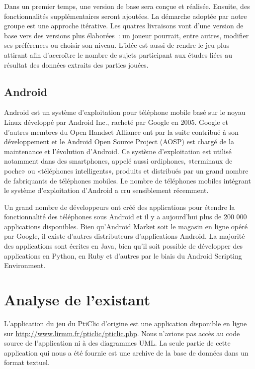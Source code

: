 \documentclass[a4paper,11pt,french]{article}
\def\android{Android\texttrademark{}}
\begin{document}
Dans un premier temps, une version de base sera conçue et réalisée. Ensuite, des fonctionnalités supplémentaires seront ajoutées. La démarche adoptée par notre groupe est une approche itérative. Les quatres livraisons vont d'une version de base vers des versions plus élaborées~: un joueur pourrait, entre autres, modifier ses préférences ou choisir son niveau. L'idée est aussi de rendre le jeu plus attirant afin d'accroître le nombre de sujets participant aux études liées au résultat des données extraits des parties jouées.


\subsection{\android{}}

\android{} est un système d'exploitation pour téléphone mobile basé sur le noyau Linux développé par \android{} Inc., racheté par Google en 2005. Google et d'autres membres du Open Handset Alliance ont par la suite contribué à son développement et le \android{} Open Source Project (AOSP) est chargé de la maintenance et l'évolution d'\android{}. Ce système d'exploitation est utilisé notamment dans des smartphones, appelé aussi ordiphones, «terminaux de poche» ou «téléphones intelligents», produits et distribués par un grand nombre de fabriquants de téléphones mobiles. Le nombre de téléphones mobiles intégrant le système d'exploitation d'\android{} a cru sensiblement récemment.

Un grand nombre de développeurs ont créé des applications pour étendre la fonctionnalité des téléphones sous \android{} et il y a aujourd'hui
plus de 200 000 applications disponibles. Bien qu'\android{} Market soit le magasin en ligne opéré par Google, il existe d'autres distributeurs
d'applications \android{}. La majorité des applications sont écrites en Java, bien qu'il soit possible de développer des applications en
Python, en Ruby et d'autres par le biais du \android{} Scripting Environment.

 
\section{Analyse de l'existant}

L'application du jeu du PtiClic d'origine est une application disponible en ligne sur \url{http://www.lirmm.fr/pticlic/pticlic.php}. Nous
n'avions pas accès au code source de l'application ni à des diagrammes UML. La seule partie de cette application qui nous a été fournie est
une archive de la base de données dans un format textuel.
\end{document}
